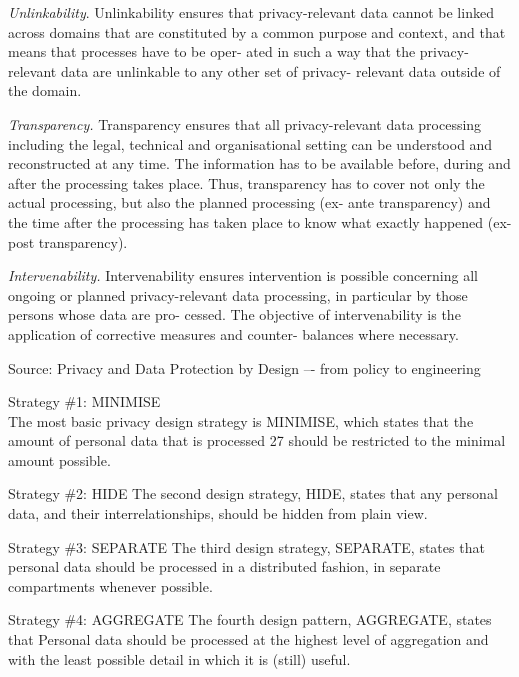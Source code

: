 \documentclass[Screen16to9,17pt]{foils}
\begin{document}
\begin{list2}
\item {\small \emph{Unlinkability}. Unlinkability ensures that privacy-relevant data cannot be linked across domains that are constituted by a common purpose and context, and that means that processes have to be oper-
ated in such a way that the privacy-relevant data are unlinkable to any other set of privacy-
relevant data outside of the domain.}
\item {\small \emph{Transparency.} Transparency ensures that all privacy-relevant data processing including the
legal, technical and organisational setting can be understood and reconstructed at any time.
The information has to be available before, during and after the processing takes place. Thus,
transparency has to cover not only the actual processing, but also the planned processing (ex-
ante transparency) and the time after the processing has taken place to know what exactly
happened (ex-post transparency).}
\item {\small \emph{Intervenability.} Intervenability ensures intervention is possible concerning all ongoing or
planned privacy-relevant data processing, in particular by those persons whose data are pro-
cessed. The objective of intervenability is the application of corrective measures and counter-
balances where necessary.}
\end{list2}
Source: Privacy and Data Protection by Design –- from policy to engineering




\begin{list2}
\item Strategy \#1: MINIMISE\\
The most basic privacy design strategy is MINIMISE, which states that the amount of personal data
that is processed 27 should be restricted to the minimal amount possible.
\item Strategy \#2: HIDE
The second design strategy, HIDE, states that any personal data, and their interrelationships, should
be hidden from plain view.
\item Strategy \#3: SEPARATE
The third design strategy, SEPARATE, states that personal data should be processed in a distributed
fashion, in separate compartments whenever possible.
\item Strategy \#4: AGGREGATE
The fourth design pattern, AGGREGATE, states that Personal data should be processed at the highest
level of aggregation and with the least possible detail in which it is (still) useful.
\end{list2}
\end{document}
